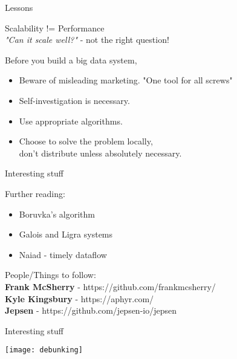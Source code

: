 \begin{frame}[t]{Lessons}

  \pause

  \begin{center}
    \large{Scalability != Performance}\\
    \vspace{0.1cm}
    \textit{"Can it scale well?"} - not the right question!
  \end{center}
  
  \vspace{0.5cm}
  \pause
  
  Before you build a big data system,
  \vspace{0.1cm}
  \begin{itemize}
    \item Beware of misleading marketing. "One tool for all screws"
    \item Self-investigation is necessary.
    \item Use appropriate algorithms.
    \item Choose to solve the problem locally,\\ don't distribute unless absolutely necessary.
  \end{itemize}

\end{frame}

\begin{frame}[t]{Interesting stuff}

  \vspace{0.25cm}

  Further reading:
  \vspace{0.25cm}
  \begin{itemize}
    \item Boruvka’s algorithm
    \item Galois and Ligra systems
    \item Naiad - timely dataflow
  \end{itemize}

  \vspace{0.5cm}

  People/Things to follow:\\
  \vspace{0.25cm}
  \textbf{Frank McSherry} - https://github.com/frankmcsherry/\\
  \vspace{0.30cm}
  \textbf{Kyle Kingsbury} - https://aphyr.com/\\
  \vspace{0.25cm}
  \textbf{Jepsen} - https://github.com/jepsen-io/jepsen 

\end{frame}

\begin{frame}[t]{Interesting stuff}

  \vspace{0.25cm}

  \begin{center}
    \texttt{[image: debunking]}
  \end{center}

\end{frame}


